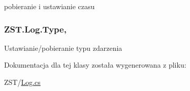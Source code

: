 pobieranie i ustawianie czasu 

\hypertarget{class_z_s_t_1_1_log_acbdc6d736db18eb65a7d80b94d03be07}{}
\subsubsection[{Type}]{ Z\+S\+T.\+Log.\+Type\hspace{0.3cm}{\ttfamily [get]}, {\ttfamily [set]}}\label{class_z_s_t_1_1_log_acbdc6d736db18eb65a7d80b94d03be07}


Ustawianie/pobieranie typu zdarzenia 



Dokumentacja dla tej klasy została wygenerowana z pliku\+:\begin{DoxyCompactItemize}
\item 
Z\+S\+T/\hyperlink{_log_8cs}{Log.\+cs}\end{DoxyCompactItemize}
